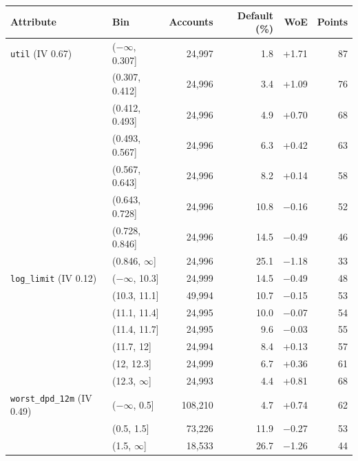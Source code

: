 \begin{tabular}{llrrrr}
\toprule
Attribute & Bin & Accounts & Default (\%) & WoE & Points \\
\midrule
\texttt{util} (IV 0.67) & ($-\infty$, 0.307] & 24,997 & 1.8 & +1.71 & 87 \\
 & (0.307, 0.412] & 24,996 & 3.4 & +1.09 & 76 \\
 & (0.412, 0.493] & 24,996 & 4.9 & +0.70 & 68 \\
 & (0.493, 0.567] & 24,996 & 6.3 & +0.42 & 63 \\
 & (0.567, 0.643] & 24,996 & 8.2 & +0.14 & 58 \\
 & (0.643, 0.728] & 24,996 & 10.8 & $-$0.16 & 52 \\
 & (0.728, 0.846] & 24,996 & 14.5 & $-$0.49 & 46 \\
 & (0.846, $\infty$] & 24,996 & 25.1 & $-$1.18 & 33 \\
\addlinespace
\texttt{log\_limit} (IV 0.12) & ($-\infty$, 10.3] & 24,999 & 14.5 & $-$0.49 & 48 \\
 & (10.3, 11.1] & 49,994 & 10.7 & $-$0.15 & 53 \\
 & (11.1, 11.4] & 24,995 & 10.0 & $-$0.07 & 54 \\
 & (11.4, 11.7] & 24,995 & 9.6 & $-$0.03 & 55 \\
 & (11.7, 12] & 24,994 & 8.4 & +0.13 & 57 \\
 & (12, 12.3] & 24,999 & 6.7 & +0.36 & 61 \\
 & (12.3, $\infty$] & 24,993 & 4.4 & +0.81 & 68 \\
\addlinespace
\texttt{worst\_dpd\_12m} (IV 0.49) & ($-\infty$, 0.5] & 108,210 & 4.7 & +0.74 & 62 \\
 & (0.5, 1.5] & 73,226 & 11.9 & $-$0.27 & 53 \\
 & (1.5, $\infty$] & 18,533 & 26.7 & $-$1.26 & 44 \\
\bottomrule
\end{tabular}
